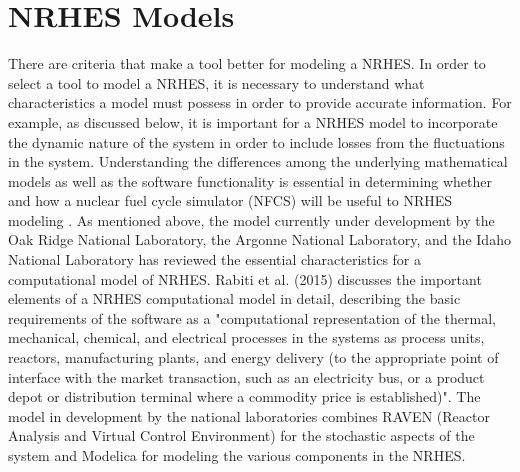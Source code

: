 \documentclass[12pt]{UIdahoMastersThesis}
\begin{document}
\section{NRHES Models}
There are criteria that make a tool better for modeling a NRHES. In order to select a tool to model a NRHES, it is necessary to understand what characteristics a model must possess in order to provide accurate information. For example, as discussed below, it is important for a NRHES model to incorporate the dynamic nature of the system in order to include losses from the fluctuations in the system. Understanding the differences among the underlying mathematical models as well as the software functionality is essential in determining whether and how a nuclear fuel cycle simulator (NFCS) will be useful to NRHES modeling .
As mentioned above, the model currently under development by the Oak Ridge National Laboratory, the Argonne National Laboratory, and the Idaho National Laboratory has reviewed the essential characteristics for a computational model of NRHES. Rabiti et al. (2015) discusses the important elements of a NRHES computational model in detail, describing the basic requirements of the software as a "computational representation of the thermal, mechanical, chemical, and electrical processes in the systems as process units, reactors, manufacturing plants, and energy delivery (to the appropriate point of interface with the market transaction, such as an electricity bus, or a product depot or distribution terminal where a commodity price is established)"\cite{Rabiti2015}. The model in development by the national laboratories combines RAVEN (Reactor Analysis and Virtual Control Environment) for the stochastic aspects of the system and Modelica for modeling the various components in the NRHES.
\end{document}
